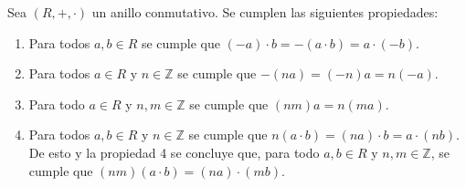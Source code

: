 \begin{proposition}\label{propiedades_anillos}
    Sea $(R, +, \cdot)$ un anillo conmutativo. Se cumplen las siguientes propiedades:
    \begin{enumerate}
    \item Para todos $a,b\in R$ se cumple que $(-a)\cdot b=-(a\cdot b) = a\cdot (-b)$.
    
    \item Para todos $a \in R$ y $n \in \mathbb{Z}$ se cumple que $-(na) = (-n)a = n(-a)$.
    
    \item Para todo $a \in R$ y $n,m \in \mathbb{Z}$ se cumple que $(nm)a = n(ma)$.
    
    \item Para todos $a,b\in R$ y $n \in \mathbb{Z}$ se cumple que $n(a\cdot b) = (na)\cdot b = a \cdot (nb)$. De esto y la propiedad 4 se concluye que, para todo $a,b\in R$ y $n,m \in \mathbb{Z}$, se cumple que $(nm)(a\cdot b) = (na)\cdot (mb)$.   
    \end{enumerate}
    \end{proposition}
    

